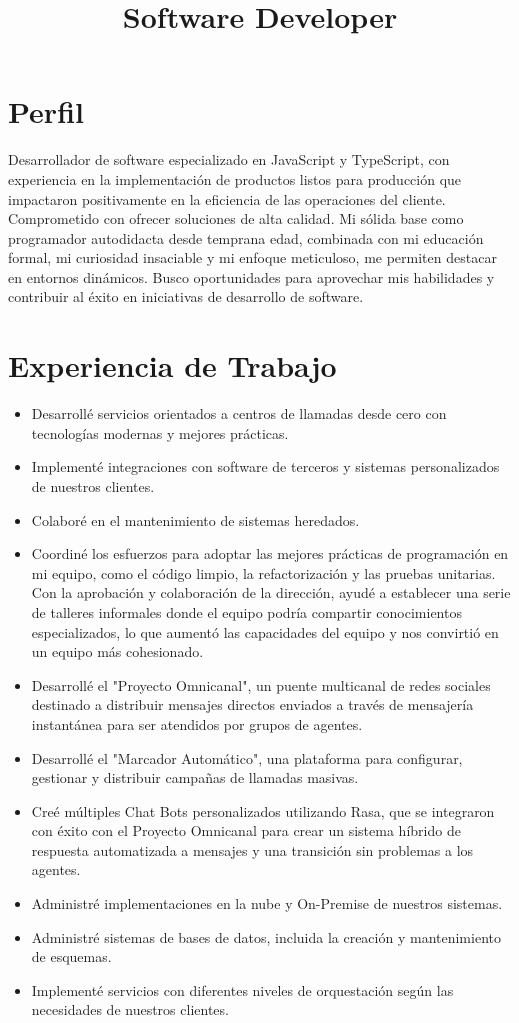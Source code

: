 \documentclass[11pt,letterpaper,sans]{moderncv}
\title{Software Developer}
\begin{document}
\makecvtitle

\section{Perfil}
Desarrollador de software especializado en JavaScript y TypeScript, con experiencia en la implementación de productos listos para producción que impactaron positivamente en la eficiencia de las operaciones del cliente. Comprometido con ofrecer soluciones de alta calidad. Mi sólida base como programador autodidacta desde temprana edad, combinada con mi educación formal, mi curiosidad insaciable y mi enfoque meticuloso, me permiten destacar en entornos dinámicos. Busco oportunidades para aprovechar mis habilidades y contribuir al éxito en iniciativas de desarrollo de software.

\section{Experiencia de Trabajo}
\begin{itemize}
  \item Desarrollé servicios orientados a centros de llamadas desde cero con tecnologías modernas y mejores prácticas.
  \item Implementé integraciones con software de terceros y sistemas personalizados de nuestros clientes.
  \item Colaboré en el mantenimiento de sistemas heredados.
  \item Coordiné los esfuerzos para adoptar las mejores prácticas de programación en mi equipo, como el código limpio, la refactorización y las pruebas unitarias. Con la aprobación y colaboración de la dirección, ayudé a establecer una serie de talleres informales donde el equipo podría compartir conocimientos especializados, lo que aumentó las capacidades del equipo y nos convirtió en un equipo más cohesionado.
  \item Desarrollé el "Proyecto Omnicanal", un puente multicanal de redes sociales destinado a distribuir mensajes directos enviados a través de mensajería instantánea para ser atendidos por grupos de agentes.
  \item Desarrollé el "Marcador Automático", una plataforma para configurar, gestionar y distribuir campañas de llamadas masivas.
  \item Creé múltiples Chat Bots personalizados utilizando Rasa, que se integraron con éxito con el Proyecto Omnicanal para crear un sistema híbrido de respuesta automatizada a mensajes y una transición sin problemas a los agentes.
  \item Administré implementaciones en la nube y On-Premise de nuestros sistemas.
  \item Administré sistemas de bases de datos, incluida la creación y mantenimiento de esquemas.
  \item Implementé servicios con diferentes niveles de orquestación según las necesidades de nuestros clientes.
\end{itemize}
\end{document}
